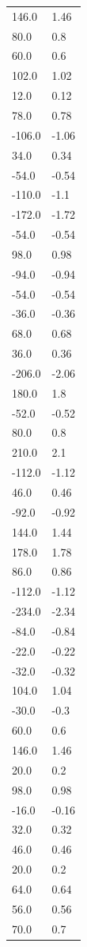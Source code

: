 \begin{longtable}{ll}
146.0 & 1.46 \\
80.0 & 0.8 \\
60.0 & 0.6 \\
102.0 & 1.02 \\
12.0 & 0.12 \\
78.0 & 0.78 \\
-106.0 & -1.06 \\
34.0 & 0.34 \\
-54.0 & -0.54 \\
-110.0 & -1.1 \\
-172.0 & -1.72 \\
-54.0 & -0.54 \\
98.0 & 0.98 \\
-94.0 & -0.94 \\
-54.0 & -0.54 \\
-36.0 & -0.36 \\
68.0 & 0.68 \\
36.0 & 0.36 \\
-206.0 & -2.06 \\
180.0 & 1.8 \\
-52.0 & -0.52 \\
80.0 & 0.8 \\
210.0 & 2.1 \\
-112.0 & -1.12 \\
46.0 & 0.46 \\
-92.0 & -0.92 \\
144.0 & 1.44 \\
178.0 & 1.78 \\
86.0 & 0.86 \\
-112.0 & -1.12 \\
-234.0 & -2.34 \\
-84.0 & -0.84 \\
-22.0 & -0.22 \\
-32.0 & -0.32 \\
104.0 & 1.04 \\
-30.0 & -0.3 \\
60.0 & 0.6 \\
146.0 & 1.46 \\
20.0 & 0.2 \\
98.0 & 0.98 \\
-16.0 & -0.16 \\
32.0 & 0.32 \\
46.0 & 0.46 \\
20.0 & 0.2 \\
64.0 & 0.64 \\
56.0 & 0.56 \\
70.0 & 0.7 \\

\end{longtable}
